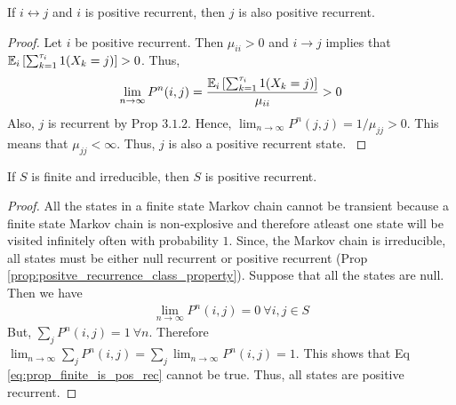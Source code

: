 \documentclass[all-lectures.tex]{subfiles}
\begin{document}
\begin{prop} \label{prop:positve_recurrence_class_property}
If $i\leftrightarrow j$ and $i$ is positive recurrent, then $j$ is also positive recurrent. 
\begin{proof}
Let $i$ be positive recurrent. Then $\mu_{ii} > 0$ and $i\rightarrow j$ implies that $\mathbb{E}_i\left[\sum_{k=1}^{\tau_i} 1(X_k=j)\right] > 0$. Thus, 
\begin{align*}
\lim_{n\rightarrow \infty} P^n(i,j) = \frac{\mathbb{E}_i\left[\sum_{k=1}^{\tau_i} 1(X_k=j)\right]}{\mu_{ii}} >0
\end{align*}
{\color{red}Also, $j$ is recurrent by Prop $3.1.2$. Hence, $\lim_{n\rightarrow \infty} P^n(j,j) = 1/\mu_{jj} > 0$. This means that $\mu_{jj} < \infty$. Thus, $j$ is also a positive recurrent state. }
\end{proof}
\end{prop}

\begin{prop}
If $S$ is finite and irreducible, then $S$ is positive recurrent. 
\begin{proof}
All the states in a finite state Markov chain cannot be transient because a finite state Markov chain is non-explosive and therefore atleast one state will be visited infinitely often with probability $1$. Since, the Markov chain is irreducible, all states must be either null recurrent or positive recurrent (Prop \ref{prop:positve_recurrence_class_property}). Suppose that all the states are null. Then we have
\begin{align} \label{eq:prop_finite_is_pos_rec}
\lim_{n\rightarrow \infty} P^n(i,j) = 0 \ \forall i,j \in S
\end{align} 
{\color{red}
But, $\sum_j P^n(i,j) = 1\ \forall n$. Therefore $\lim_{n \rightarrow \infty} \sum_j P^n(i,j) = \sum_j \lim_{n \rightarrow \infty}  P^n(i,j) = 1$. This shows that Eq \ref{eq:prop_finite_is_pos_rec} cannot be true. Thus, all states are positive recurrent.}
\end{proof}
\end{prop}
\end{document}
